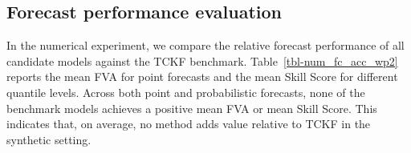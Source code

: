 \documentclass[
  11pt,
  authoryear,
  doubleblind,
  3p]{elsarticle}
\begin{document}
\subsection{Forecast performance
evaluation}\label{forecast-performance-evaluation}

In the numerical experiment, we compare the relative forecast
performance of all candidate models against the TCKF benchmark.
Table~\ref{tbl-num_fc_acc_wp2} reports the mean FVA for point forecasts
and the mean Skill Score for different quantile levels. Across both
point and probabilistic forecasts, none of the benchmark models achieves
a positive mean FVA or mean Skill Score. This indicates that, on
average, no method adds value relative to TCKF in the synthetic setting.

\begin{table}[H]

\caption{\label{tbl-num_fc_acc_wp2}Overall forecast performance,
expressed as mean FVA and mean Skill Scores, in the numerical
experiment. Best values in each column are highlighted in bold.}

\centering{

\centering\begingroup\fontsize{6}{8}\selectfont

}
\end{table}
\end{document}
